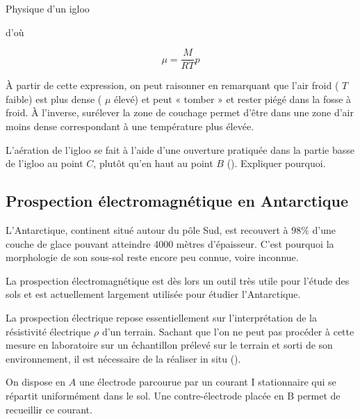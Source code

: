 \begin{exo}[PC][1][devoir]{Physique d'un igloo}
\begin{quest}
{d'où

$$
\mu=\frac{M}{R T} p
$$

À partir de cette expression, on peut raisonner en remarquant que l'air froid ( $T$ faible) est plus dense ( $\mu$ élevé) et peut « tomber » et rester piégé dans la fosse à froid. À l'inverse, surélever la zone de couchage permet d'être dans une zone d'air moins dense correspondant à une température plus élevée.
}

\item L'aération de l'igloo se fait à l'aide d'une ouverture pratiquée dans la partie basse de l'igloo au point $C$, plutôt qu'en haut au point $B$ (). Expliquer pourquoi.
\end{quest}

\subsection{Prospection électromagnétique en Antarctique}
L'Antarctique, continent situé autour du pôle Sud, est recouvert à $98 \%$ d'une couche de glace pouvant atteindre 4000 mètres d'épaisseur. C'est pourquoi la morphologie de son sous-sol reste encore peu connue, voire inconnue.

La prospection électromagnétique est dès lors un outil très utile pour l'étude des sols et est actuellement largement utilisée pour étudier l'Antarctique.

La prospection électrique repose essentiellement sur l'interprétation de la résistivité électrique $\rho$ d'un terrain. Sachant que l'on ne peut pas procéder à cette mesure en laboratoire sur un échantillon prélevé sur le terrain et sorti de son environnement, il est nécessaire de la réaliser in situ ().

On dispose en $A$ une électrode parcourue par un courant I stationnaire qui se répartit uniformément dans le sol. Une contre-électrode placée en B permet de recueillir ce courant.


\end{exo}

